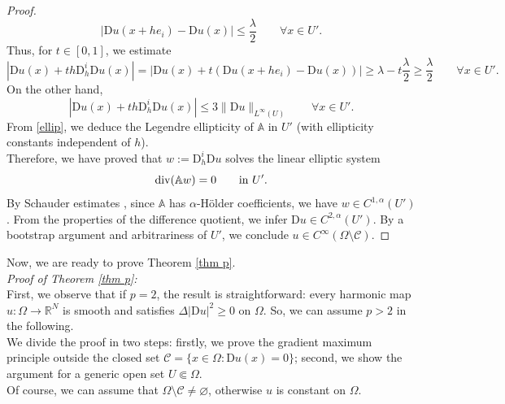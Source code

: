\documentclass[a4paper,11pt]{article}
\numberwithin{equation}{section}
\newcommand{\numberset}{\mathbb}
\newcommand{\Om}{\Omega}
\newcommand{\R}{\numberset{R}}
\newcommand{\rom}{\mathrm}
\theoremstyle{definition}
\begin{document}
\begin{proof}
$$
|\rom Du(x+he_i)-\rom Du(x)|\leq\frac{\lambda}{2}\qquad\forall x\in U'.
$$
Thus, for $t\in[0,1]$, we estimate
$$
|\rom Du(x)+th\rom D_h^i\rom Du(x)|=|\rom Du(x)+t(\rom Du(x+he_i)-\rom Du(x))|\geq\lambda-t\frac{\lambda}2\geq\frac{\lambda}2\qquad\forall x\in U'.
$$
On the other hand, 
$$
|\rom Du(x)+th\rom D_h^i\rom Du(x)|\leq 3\|\rom Du\|_{L^\infty(U)}\qquad\forall x\in U'.
$$
From \eqref{ellip}, we deduce the Legendre ellipticity of $\mathbb A$ in $U'$ (with ellipticity constants independent of $h$).\\
Therefore, we have proved that $w:=\rom D_h^i \rom Du$ solves the linear elliptic system
$$
{\rm div}(\mathbb Aw)=0\qquad\mbox{in } U'.
$$
By Schauder estimates \cite[Thm. 5.19]{GM}, since $\mathbb A$ has $\alpha$-H\"older coefficients, we have $w\in C^{1,\alpha}(U')$. From the properties of the difference quotient, we infer $\rom D u\in C^{2,\alpha}(U')$. By a bootstrap argument and arbitrariness of $U'$, we conclude $u\in C^\infty(\Om\setminus\mathscr C)$.
\end{proof}

Now, we are ready to prove Theorem \ref{thm p}.\\

\textit{Proof of Theorem \ref{thm p}:}\\
First, we observe that if $p=2$, the result is straightforward: every harmonic map $u:\Om\to\R^N$ is smooth and satisfies $\Delta|\rom Du|^2\geq0$ on $\Om$.
So, we can assume $p>2$ in the following. \\
We divide the proof in two steps: firstly, we prove the gradient maximum principle outside the closed set $\mathscr{C}=\{x\in\Om:\mathrm Du(x)=0\}$; second, we show the argument for a generic open set $U\Subset\Om$.\\
Of course, we can assume that $\Om\setminus\mathscr C\neq \varnothing$, otherwise $u$ is constant on $\Om$.\\
\end{document}
